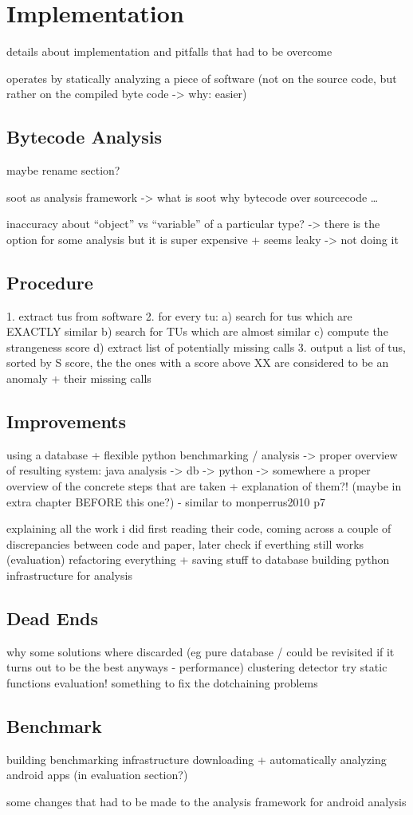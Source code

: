 \chapter{Implementation}
details about implementation and pitfalls that had to be overcome

operates by statically analyzing a piece of software
(not on the source code, but rather on the compiled byte code -> why: easier)

\section{Bytecode Analysis}
maybe rename section?

soot as analysis framework -> what is soot
why bytecode over sourcecode
\ldots

inaccuracy about ``object'' vs ``variable'' of a particular type?
-> there is the option for some analysis but it is super  expensive + seems leaky -> not doing it

\section{Procedure}

1. extract tus from software
2. for every tu:
    a) search for tus which are EXACTLY similar
    b) search for TUs which are almost similar
    c) compute the strangeness score
    d) extract list of potentially missing calls
3. output a list of tus, sorted by S score, the the ones with a score above XX are considered to be an anomaly + their missing calls

\section{Improvements}
using a database + flexible python benchmarking / analysis
-> proper overview of resulting system: java analysis -> db -> python
-> somewhere a proper overview of the concrete steps that are taken + explanation of them?! (maybe in extra chapter BEFORE this one?) - similar to monperrus2010 p7

explaining all the work i did
    first reading their code, coming across a couple of discrepancies between code and paper, later check if everthing still works (evaluation)
    refactoring everything + saving stuff to database
    building python infrastructure for analysis

\section{Dead Ends}
why some solutions where discarded (eg pure database / could be revisited if it turns out to be the best anyways - performance)
    clustering detector try
static functions evaluation!
something to fix the dotchaining problems

\section{Benchmark}

building benchmarking infrastructure
downloading + automatically analyzing android apps (in evaluation section?)

some changes that had to be made to the analysis framework for android analysis
